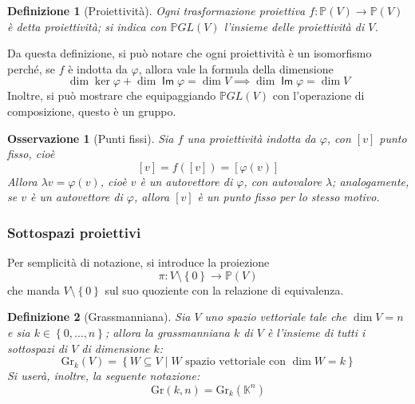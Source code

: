 \documentclass[11pt, a4paper]{scrartcl}
\theoremstyle{style1}
\newtheorem{osservazione}{Osservazione}[section]
\newtheorem{definizione}{Definizione}[section]
\numberwithin{equation}{subsection}
\renewcommand{\operatorname}[1]{\mathop{\mathrm{\textsf{#1}}}}
\begin{document}
\begin{definizione}
[Proiettivit\`a]
Ogni trasformazione proiettiva $f:\mathbb{P}(V) \to \mathbb{P}(V)$ \`e detta \textit{proiettivit\`a}; si indica con $\mathbb{P}GL(V)$ l'insieme delle proiettivit\`a di $V$.
\end{definizione}
\noindent Da questa definizione, si pu\`o notare che ogni proiettivit\`a \`e un isomorfismo perch\'e, se $f$ \`e indotta da $\varphi $, allora vale la formula della dimensione 
\[
	\dim \ker \varphi + \dim \operatorname{Im} \varphi = \dim V \implies \dim \operatorname{Im} \varphi  = \dim V
\] 
Inoltre, si pu\`o mostrare che equipaggiando $\mathbb{P}GL(V)$ con l'operazione di composizione, questo \`e un gruppo.
\begin{osservazione}
	[Punti fissi]
	Sia $f$ una proiettivit\`a indotta da $\varphi $, con $[v]$ punto fisso, cio\`e
	\[
		[v]  = f([v]) = [\varphi (v)]
	\] 
	Allora $\lambda v = \varphi (v)$, cio\`e $v$ \`e un autovettore di $\varphi $, con autovalore $\lambda $; analogamente, se $v$ \`e un autovettore di $\varphi $, allora $[v]$ \`e un punto fisso per lo stesso motivo.
\end{osservazione}
\subsubsection{Sottospazi proiettivi}
Per semplicit\`a di notazione, si introduce la proiezione
\begin{equation}
	\pi : V \setminus \left\{ 0 \right\} \to \mathbb{P}(V)
\end{equation}
che manda $V \setminus \left\{ 0 \right\} $ sul suo quoziente con la relazione di equivalenza.
\begin{definizione}
	[Grassmanniana]
	Sia $V$ uno spazio vettoriale tale che $\dim V = n$ e sia $k \in \left\{ 0,\ldots,n \right\}$; allora la \textit{grassmanniana} $k$ di $V$ \`e l'insieme di tutti i sottospazi di $V$ di dimensione $k$:
	\[
	\mathrm{Gr} _k (V) = \left\{ W \subseteq V  \mid W \text{ spazio vettoriale con } \dim W = k \right\} 
	\] 
Si user\`a, inoltre, la seguente notazione:
\[
\mathrm{Gr}  (k,n) = \mathrm{Gr}  _{k} (\mathbb{K}^{n} )
\] 
\end{definizione}
\end{document}
